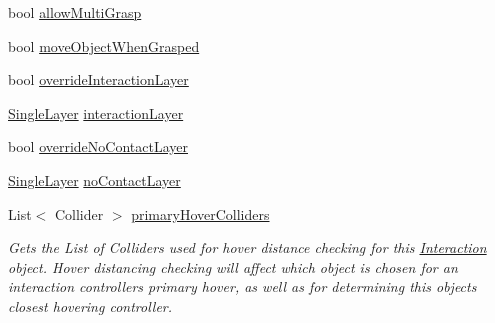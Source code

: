 \begin{DoxyCompactItemize}
\item 
bool \mbox{\hyperlink{class_leap_1_1_unity_1_1_interaction_1_1_interaction_behaviour_ab6d20195a414a145fcc7fcaaa6fda0f0}{allow\+Multi\+Grasp}}
\item 
bool \mbox{\hyperlink{class_leap_1_1_unity_1_1_interaction_1_1_interaction_behaviour_a5fc6eab23862e17b78936e29a31cbd7c}{move\+Object\+When\+Grasped}}
\item 
bool \mbox{\hyperlink{class_leap_1_1_unity_1_1_interaction_1_1_interaction_behaviour_afba68aaef15e657c81e2d9e36a1e0eca}{override\+Interaction\+Layer}}
\item 
\mbox{\hyperlink{struct_leap_1_1_unity_1_1_single_layer}{Single\+Layer}} \mbox{\hyperlink{class_leap_1_1_unity_1_1_interaction_1_1_interaction_behaviour_a6b8e0701fb4b5f610a95fa5681ffd9b7}{interaction\+Layer}}
\item 
bool \mbox{\hyperlink{class_leap_1_1_unity_1_1_interaction_1_1_interaction_behaviour_aa526111d0edd48f0077a9fe68b009933}{override\+No\+Contact\+Layer}}
\item 
\mbox{\hyperlink{struct_leap_1_1_unity_1_1_single_layer}{Single\+Layer}} \mbox{\hyperlink{class_leap_1_1_unity_1_1_interaction_1_1_interaction_behaviour_a050d58ca4a887290b9b7e34748eb6c49}{no\+Contact\+Layer}}
\item 
List$<$ Collider $>$ \mbox{\hyperlink{class_leap_1_1_unity_1_1_interaction_1_1_interaction_behaviour_abcc862431a7751c499e474799dfcd822}{primary\+Hover\+Colliders}}
\begin{DoxyCompactList}\small\item\em Gets the List of Colliders used for hover distance checking for this \mbox{\hyperlink{namespace_leap_1_1_unity_1_1_interaction}{Interaction}} object. Hover distancing checking will affect which object is chosen for an interaction controller\textquotesingle{}s primary hover, as well as for determining this object\textquotesingle{}s closest hovering controller. \end{DoxyCompactList}\item 

\end{DoxyCompactItemize}
